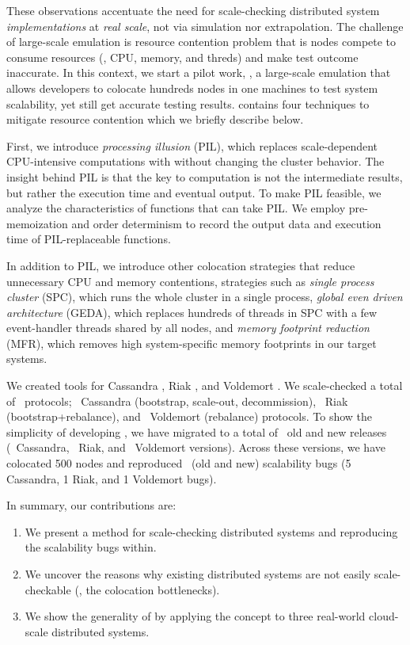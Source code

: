 These observations accentuate the need for scale-checking distributed system
{\em implementations} at {\em real scale}, not via simulation nor extrapolation.
The challenge of large-scale emulation is resource contention problem that is
nodes compete to consume resources (\eg, CPU, memory, and threds) and make test
outcome inaccurate.
%
In this context, we start a pilot work, \sck, a large-scale emulation that
allows developers to colocate hundreds nodes in one machines to test system
scalability, yet still get accurate testing results. \sck contains four
techniques to mitigate resource contention which we briefly describe below.

First, we introduce {\em processing illusion} (PIL), which replaces
scale-dependent CPU-intensive computations with \sleep without changing the
cluster behavior.  The insight behind PIL is that the key to computation is not
the intermediate results, but rather the execution time and eventual output.  To
make PIL feasible, we analyze the characteristics of functions that can take
PIL.  We employ pre-memoization and order determinism to record the output data
and execution time of PIL-replaceable functions.

In addition to PIL, we introduce other colocation strategies
that reduce unnecessary CPU and memory contentions, strategies such as
%
{\em single process cluster} (SPC), which runs the whole cluster
in a single process,
%
{\em global even driven architecture} (GEDA), which replaces
hundreds of threads in SPC with a few event-handler threads
shared by all nodes,
%
and {\em memory footprint reduction} (MFR), which removes high
system-specific memory footprints in our target systems.

We created \sck tools for Cassandra \cite{Lakshman+09-Cassandra}, Riak
\cite{RiakWeb}, and Voldemort \cite{VoldemortWeb}.
%
We scale-checked a total of \numProt\ protocols; \numProtCass\ Cassandra
(bootstrap, scale-out, decommission), \numProtRiak\ Riak (bootstrap+rebalance),
and \numProtVold\ Voldemort (rebalance) protocols.
%
To show the simplicity of developing \sck, we have migrated \sck to a total of
\numVers\ old and new releases (\numVersCass\ Cassandra, \numVersRiak\ Riak, and
\numVersVold\ Voldemort versions).
%
Across these versions, we have colocated 500 nodes and reproduced \numEval\ (old
and new) scalability bugs (5 Cassandra, 1 Riak, and 1 Voldemort bugs).

In summary, our contributions are:
%
\begin{enumerate} \item We present a method for scale-checking distributed
systems and reproducing the scalability bugs within.
%
\item We uncover the reasons why existing distributed systems are not easily
scale-checkable (\ie, the colocation bottlenecks).
%
\item We show the generality of \sck by applying the concept to three real-world
cloud-scale distributed systems.
%
\end{enumerate}

